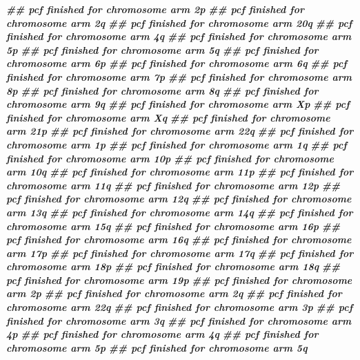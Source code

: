 \documentclass[
  12pt,
  a4paper,
  twoside]{book}
\newenvironment{Shaded}{\begin{snugshade}}{\end{snugshade}}
\newcommand{\DocumentationTok}[1]{\textcolor[rgb]{0.56,0.35,0.01}{\textbf{\textit{#1}}}}
\begin{document}
\begin{Shaded}
\begin{Highlighting}[]
\DocumentationTok{\#\# pcf finished for chromosome arm 2p }
\DocumentationTok{\#\# pcf finished for chromosome arm 2q }
\DocumentationTok{\#\# pcf finished for chromosome arm 20q }
\DocumentationTok{\#\# pcf finished for chromosome arm 4q }
\DocumentationTok{\#\# pcf finished for chromosome arm 5p }
\DocumentationTok{\#\# pcf finished for chromosome arm 5q }
\DocumentationTok{\#\# pcf finished for chromosome arm 6p }
\DocumentationTok{\#\# pcf finished for chromosome arm 6q }
\DocumentationTok{\#\# pcf finished for chromosome arm 7p }
\DocumentationTok{\#\# pcf finished for chromosome arm 8p }
\DocumentationTok{\#\# pcf finished for chromosome arm 8q }
\DocumentationTok{\#\# pcf finished for chromosome arm 9q }
\DocumentationTok{\#\# pcf finished for chromosome arm Xp }
\DocumentationTok{\#\# pcf finished for chromosome arm Xq }
\DocumentationTok{\#\# pcf finished for chromosome arm 21p }
\DocumentationTok{\#\# pcf finished for chromosome arm 22q }
\DocumentationTok{\#\# pcf finished for chromosome arm 1p }
\DocumentationTok{\#\# pcf finished for chromosome arm 1q }
\DocumentationTok{\#\# pcf finished for chromosome arm 10p }
\DocumentationTok{\#\# pcf finished for chromosome arm 10q }
\DocumentationTok{\#\# pcf finished for chromosome arm 11p }
\DocumentationTok{\#\# pcf finished for chromosome arm 11q }
\DocumentationTok{\#\# pcf finished for chromosome arm 12p }
\DocumentationTok{\#\# pcf finished for chromosome arm 12q }
\DocumentationTok{\#\# pcf finished for chromosome arm 13q }
\DocumentationTok{\#\# pcf finished for chromosome arm 14q }
\DocumentationTok{\#\# pcf finished for chromosome arm 15q }
\DocumentationTok{\#\# pcf finished for chromosome arm 16p }
\DocumentationTok{\#\# pcf finished for chromosome arm 16q }
\DocumentationTok{\#\# pcf finished for chromosome arm 17p }
\DocumentationTok{\#\# pcf finished for chromosome arm 17q }
\DocumentationTok{\#\# pcf finished for chromosome arm 18p }
\DocumentationTok{\#\# pcf finished for chromosome arm 18q }
\DocumentationTok{\#\# pcf finished for chromosome arm 19p }
\DocumentationTok{\#\# pcf finished for chromosome arm 2p }
\DocumentationTok{\#\# pcf finished for chromosome arm 2q }
\DocumentationTok{\#\# pcf finished for chromosome arm 22q }
\DocumentationTok{\#\# pcf finished for chromosome arm 3p }
\DocumentationTok{\#\# pcf finished for chromosome arm 3q }
\DocumentationTok{\#\# pcf finished for chromosome arm 4p }
\DocumentationTok{\#\# pcf finished for chromosome arm 4q }
\DocumentationTok{\#\# pcf finished for chromosome arm 5p }
\DocumentationTok{\#\# pcf finished for chromosome arm 5q }

\end{Highlighting}
\end{Shaded}
\end{document}
